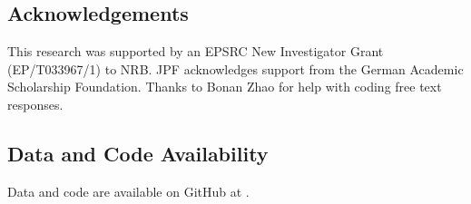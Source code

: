 \documentclass[doc,natbib,floatsintext]{apa7}
\newcommand{\MYhref}[3][blue]{\href{#2}{\color{#1}{#3}}}
\begin{document}
\subsection{Acknowledgements}
This research was supported by an EPSRC New Investigator Grant (EP/T033967/1) to NRB. JPF acknowledges support from the German Academic Scholarship Foundation. Thanks to Bonan Zhao for help with coding free text responses.

\newcommand{\commiturl}{\url{https://github.com/janphilippfranken/zendo_final_git/\commithash}}
\subsection{Data and Code Availability}
Data and code are available on GitHub at \MYhref{https://github.com/janphilippfranken/FrankenBramleyTheodoropoulos_2022}{FrankenTheodoropoulosBramley2022}. 




\end{document}
